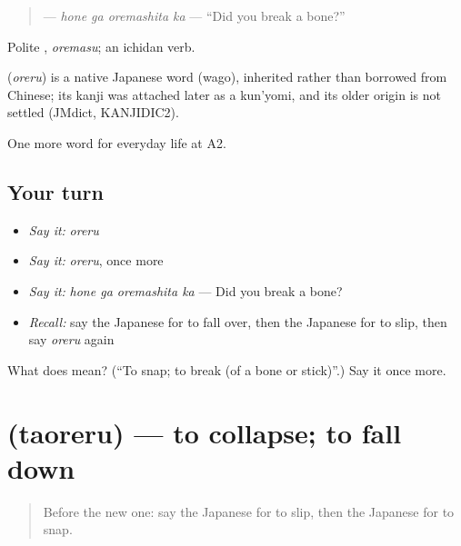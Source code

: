 \begin{quote}
\textbf{ } — \emph{hone ga oremashita ka} — \textquotedblleft{}Did you break a bone?\textquotedblright{}
\end{quote}

Polite \textbf{}, \emph{oremasu}; an ichidan verb.

\begin{cousinweb}
\textbf{} (\emph{oreru}) is a native Japanese word (wago), inherited rather than borrowed from Chinese; its kanji was attached later as a kun'yomi, and its older origin is not settled (JMdict, KANJIDIC2).
\end{cousinweb}

\begin{grammarlens}[title={What you've built}]
One more word for everyday life at A2.
\end{grammarlens}

\subsection*{Your turn}
\begin{itemize}
\raggedright
  \item \emph{Say it:} \emph{oreru}
  \item \emph{Say it:} \emph{oreru}, once more
  \item \emph{Say it:} \emph{hone ga oremashita ka} — Did you break a bone?
  \item \emph{Recall:} say the Japanese for to fall over, then the Japanese for to slip, then say \emph{oreru} again
\end{itemize}

\begin{tcolorbox}[breakable,colback=teal!4,colframe=teal!35!black,title={Before you move on}]
What does  mean? (\textquotedblleft{}To snap; to break (of a bone or stick)\textquotedblright{}.) Say it once more.
\end{tcolorbox}
\section[\texorpdfstring{\ja{たおれる} (taoreru)}{たおれる (taoreru)}]{ (taoreru) — to collapse; to fall down}

\label{lesson:JA-C219-taoreru}



\begin{quote}
Before the new one: say the Japanese for to slip, then the Japanese for to snap.
\end{quote}

